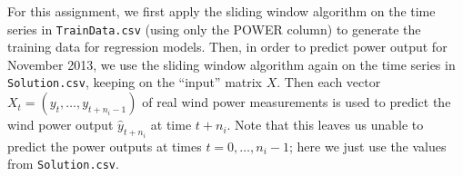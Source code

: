 \documentclass[11pt]{article}
\begin{document}
For this assignment, we first apply the sliding window algorithm on the time series in \texttt{TrainData.csv} (using only the POWER column) to generate the training data for regression models.
Then, in order to predict power output for November 2013, we use the sliding window algorithm again on the time series in \texttt{Solution.csv}, keeping on the ``input'' matrix $X$.
Then each vector $X_t = (y_t, \dots, y_{t+n_i-1})$ of real wind power measurements is used to predict the wind power output $\hat{y}_{t+n_i}$ at time $t+n_i$.
Note that this leaves us unable to predict the power outputs at times $t=0, \dots, n_i-1$; here we just use the values from \texttt{Solution.csv}.



\end{document}
